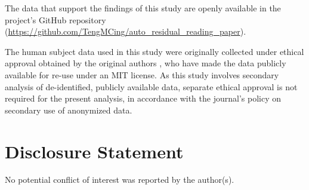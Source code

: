 \documentclass[]{interact}
\theoremstyle{plain}%
\theoremstyle{definition}
\theoremstyle{remark}
\begin{document}
The data that support the findings of this study are openly available in
the project's GitHub repository
(\url{https://github.com/TengMCing/auto_residual_reading_paper}).

The human subject data used in this study were originally collected
under ethical approval obtained by the original authors
\citet{li2024plot}, who have made the data publicly available for re-use
under an MIT license. As this study involves secondary analysis of
de-identified, publicly available data, separate ethical approval is not
required for the present analysis, in accordance with the journal's
policy on secondary use of anonymized data.

\section*{Disclosure Statement}\label{disclosure-statement}

No potential conflict of interest was reported by the author(s).



\end{document}
